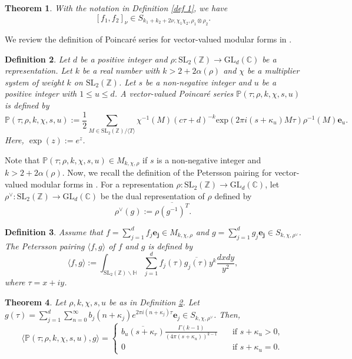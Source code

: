 \documentclass[11pt]{amsart}
\newtheorem{thm}{Theorem}[section]
\newtheorem{dfn}[thm]{Definition}
\theoremstyle{definition}
\theoremstyle{remark}
\numberwithin{equation}{section}
\renewcommand{\(}{\left(}
\renewcommand{\)}{\right)}
\def\GL{\mathrm{GL}}
\begin{document}
\begin{thm}\label{thm 1}\cite[Theorem 1.3]{Z}
    With the notation in Definition \ref{def 1}, we have 
    \[ [f_1,f_2]_{\nu}\in S_{k_1+k_2+2\nu,\chi_1\chi_2, \rho_1\otimes \rho_2}. \]
\end{thm}

We review the definition of Poincar\'e series for vector-valued modular forms in \cite[Section 3]{KM}.
\begin{dfn}\label{def 2}
Let $d$ be a positive integer and $\rho : \mathrm{SL}_{2}(\mathbb{Z})\to \mathrm{GL}_{d}(\mathbb{C})$ be a representation.
    Let $k$ be a real number with $k>2+2\alpha(\rho)$ and $\chi$ be a multiplier system of weight $k$ on $\mathrm{SL}_{2}(\mathbb{Z})$.
    Let $s$ be a non-negative integer and $u$ be a positive integer with $1\leq u\leq d$.
    A vector-valued Poincar\'{e} series $\mathbb{P}(\tau;\rho,k,\chi,s,u)$ is defined by 
    \[ \mathbb{P}(\tau;\rho,k,\chi,s,u):=\frac{1}{2} \sum_{M\in \mathrm{SL}_{2}(\mathbb{Z})/\langle T \rangle } \chi^{-1}(M)(c\tau+d)^{-k}\mathrm{exp}(2\pi i(s+\kappa_u)M\tau)\rho^{-1}(M)\mathbf{e}_{u}. \]
    Here, $\exp(z):=e^{z}$.
\end{dfn}
Note that $\mathbb{P}(\tau;\rho,k,\chi,s,u)\in M_{k,\chi,\rho}$ if $s$ is a non-negative integer and $k>2+2\alpha(\rho)$.
Now, we recall the definition of the Petersson pairing for vector-valued modular forms in \cite[Section 5]{KM}.
For a representation $\rho:\mathrm{SL}_{2}(\mathbb{Z})\to \GL_d(\mathbb{C})$, let $\rho^{\vee} : \mathrm{SL}_{2}(\mathbb{Z})\to \GL_d(\mathbb{C})$ be the dual representation of $\rho$ defined by  
\[ \rho^{\vee}(g):=\overline{\rho(g^{-1})^{T}}. \]

\begin{dfn}
   Assume that $f=\sum_{j=1}^{d} f_{j} \mathbf{e_j}\in M_{k,\chi,\rho}$ and $g=\sum_{j=1}^{d} g_{j}\mathbf{e_j}\in S_{k,\chi,\rho^{\vee}}$. 
   The Petersson pairing $\langle f , g \rangle$ of $f$ and $g$ is defined by
   \[ \langle f, g \rangle := \int_{\mathrm{SL}_{2}(\mathbb{Z})\backslash \mathbb{H}} \sum_{j=1}^{d} f_{j}(\tau)\overline{g_j(\tau)} y^{k}\frac{dxdy}{y^2},  \]
   where $\tau=x+iy$.
\end{dfn}
  

\begin{thm}\cite[Theorem 5.3]{KM}\label{thm 2}
    Let $\rho,k,\chi,s,u$ be as in Definition \ref{def 2}.
    Let $g(\tau)=\sum_{j=1}^{d}\sum_{n=0}^{\infty}b_j(n+\kappa_j)e^{2\pi i (n+\kappa_j)\tau} \mathbf{e}_{j}\in S_{k,\chi,\rho^{\vee}}$.
    Then, 
    \[ \langle \mathbb{P}(\tau;\rho,k,\chi,s,u) , g \rangle = \begin{cases}
        \overline{b_{u}(s+\kappa_r)}\frac{\Gamma(k-1)}{(4\pi(s+\kappa_u))^{k-1}} \quad &\text{if }s+\kappa_u>0,\\
        0 &\text{if }s+\kappa_u=0.
    \end{cases}  \]
\end{thm}
\end{document}
